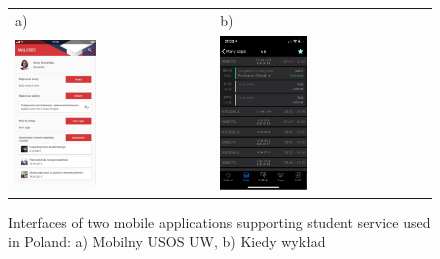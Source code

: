 \begin{figure}[htb]
    \centering
    \begin{tabular}{@{}ll@{}}
        a) & b) \\
        \includegraphics[width=0.425\textwidth]{fig01/mobilny-usos.png} &
        \includegraphics[width=0.425\textwidth]{fig01/kiedy-wyklad.png} \\
    \end{tabular}
    \caption{Interfaces of two mobile applications supporting student service used in Poland: a) Mobilny USOS UW, b) Kiedy wykład} \label{fig:similar-solutions}
\end{figure}

